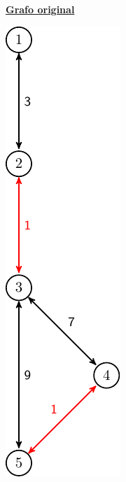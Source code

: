 \noindent
\begin{minipage}{0.2\textwidth}
	\begin{center}
		\underline{\textbf{Grafo original}}
		\newline

		\includegraphics[scale=0.6]{imagenes/ej1_ex.pdf}
	\end{center}
\end{minipage}
\hfill
